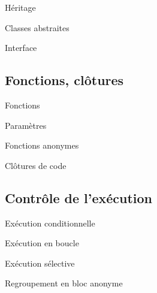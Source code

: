 \begin{frame}{Héritage}

\end{frame}

\begin{frame}{Classes abstraites}

\end{frame}

\begin{frame}{Interface}

\end{frame}

\subsection{Fonctions, clôtures}

\begin{frame}{Fonctions} %

\end{frame}

\begin{frame}{Paramètres}

\end{frame}

\begin{frame}{Fonctions anonymes} %

\end{frame}

\begin{frame}{Clôtures de code} %

\end{frame}

\subsection{Contrôle de l’exécution}

\begin{frame}{Exécution conditionnelle} %

\end{frame}

\begin{frame}{Exécution en boucle} %

\end{frame}

\begin{frame}{Exécution sélective} %

\end{frame}

\begin{frame}{Regroupement en bloc anonyme} %

\end{frame}

